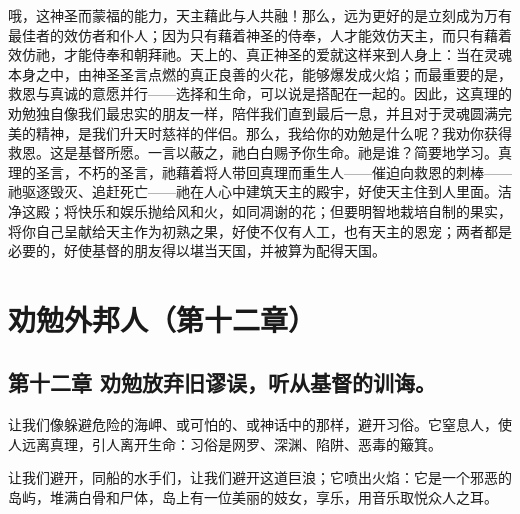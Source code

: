 哦，这神圣而蒙福的能力，天主藉此与人共融！那么，远为更好的是立刻成为万有最佳者的效仿者和仆人；因为只有藉着神圣的侍奉，人才能效仿天主，而只有藉着效仿祂，才能侍奉和朝拜祂。天上的、真正神圣的爱就这样来到人身上：当在灵魂本身之中，由神圣圣言点燃的真正良善的火花，能够爆发成火焰；而最重要的是，救恩与真诚的意愿并行——选择和生命，可以说是搭配在一起的。因此，这真理的劝勉独自像我们最忠实的朋友一样，陪伴我们直到最后一息，并且对于灵魂圆满完美的精神，是我们升天时慈祥的伴侣。那么，我给你的劝勉是什么呢？我劝你获得救恩。这是基督所愿。一言以蔽之，祂白白赐予你生命。祂是谁？简要地学习。真理的圣言，不朽的圣言，祂藉着将人带回真理而重生人——催迫向救恩的刺棒——祂驱逐毁灭、追赶死亡——祂在人心中建筑天主的殿宇，好使天主住到人里面。洁净这殿；将快乐和娱乐抛给风和火，如同凋谢的花；但要明智地栽培自制的果实，将你自己呈献给天主作为初熟之果，好使不仅有人工，也有天主的恩宠；两者都是必要的，好使基督的朋友得以堪当天国，并被算为配得天国。\par



\section{劝勉外邦人（第十二章）}

\par


\subsection{第十二章 劝勉放弃旧谬误，听从基督的训诲。}

让我们像躲避危险的海岬、或可怕的、或神话中的那样，避开习俗。它窒息人，使人远离真理，引人离开生命：习俗是网罗、深渊、陷阱、恶毒的簸箕。\par

\par

让我们避开，同船的水手们，让我们避开这道巨浪；它喷出火焰：它是一个邪恶的岛屿，堆满白骨和尸体，岛上有一位美丽的妓女，享乐，用音乐取悦众人之耳。\par

